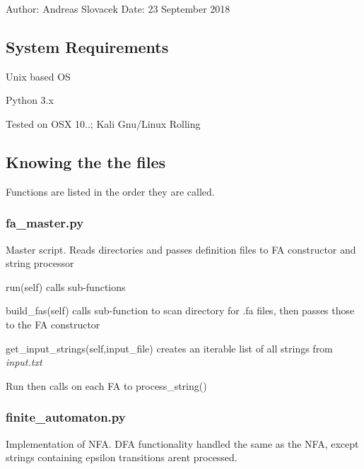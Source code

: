 Author\+: Andreas Slovacek Date\+: 23 September 2018

\subsection*{System Requirements}


\begin{DoxyItemize}
\item Unix based OS
\item Python 3.\+x
\item Tested on O\+SX 10..; Kali Gnu/\+Linux Rolling
\end{DoxyItemize}

\subsection*{Knowing the the files}

Functions are listed in the order they are called.

\subsubsection*{fa\+\_\+master.\+py}

Master script. Reads directories and passes definition files to FA constructor and string processor


\begin{DoxyItemize}
\item {\ttfamily run(self)} calls sub-\/functions
\begin{DoxyItemize}
\item {\ttfamily build\+\_\+fas(self)} calls sub-\/function to scan directory for .fa files, then passes those to the FA constructor
\item {\ttfamily get\+\_\+input\+\_\+strings(self,input\+\_\+file)} creates an iterable list of all strings from {\itshape input.\+txt}
\item Run then calls on each FA to {\ttfamily process\+\_\+string()}
\end{DoxyItemize}
\end{DoxyItemize}

\subsubsection*{finite\+\_\+automaton.\+py}

Implementation of N\+FA. D\+FA functionality handled the same as the N\+FA, except strings containing epsilon transitions aren\textquotesingle{}t processed.


